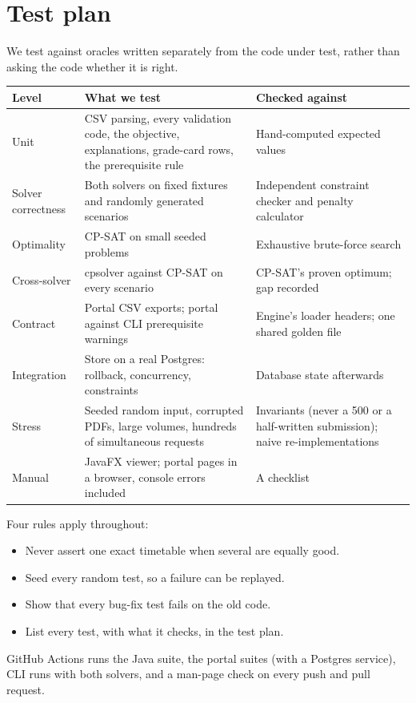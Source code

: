 \documentclass[10pt,a4paper]{article}
\begin{document}
\section{Test plan}

We test against oracles written separately from the code under test, rather than asking the code whether it is right.

\begin{tabularx}{\linewidth}{@{}L{25mm}Y L{52mm}@{}}
\toprule
\textbf{Level} & \textbf{What we test} & \textbf{Checked against}\\
\midrule
Unit & CSV parsing, every validation code, the objective, explanations, grade-card rows, the prerequisite rule & Hand-computed expected values\\
Solver correctness & Both solvers on fixed fixtures and randomly generated scenarios & Independent constraint checker and penalty calculator\\
Optimality & CP-SAT on small seeded problems & Exhaustive brute-force search\\
Cross-solver & cpsolver against CP-SAT on every scenario & CP-SAT's proven optimum; gap recorded\\
Contract & Portal CSV exports; portal against CLI prerequisite warnings & Engine's loader headers; one shared golden file\\
Integration & Store on a real Postgres: rollback, concurrency, constraints & Database state afterwards\\
Stress & Seeded random input, corrupted PDFs, large volumes, hundreds of simultaneous requests & Invariants (never a 500 or a half-written submission); naive re-implementations\\
Manual & JavaFX viewer; portal pages in a browser, console errors included & A checklist\\
\bottomrule
\end{tabularx}

\vspace{2pt}
Four rules apply throughout:
\begin{itemize}
\item Never assert one exact timetable when several are equally good.
\item Seed every random test, so a failure can be replayed.
\item Show that every bug-fix test fails on the old code.
\item List every test, with what it checks, in the test plan.
\end{itemize}
GitHub Actions runs the Java suite, the portal suites (with a Postgres service), CLI runs with both solvers, and a man-page check on every push and pull request.
\end{document}
